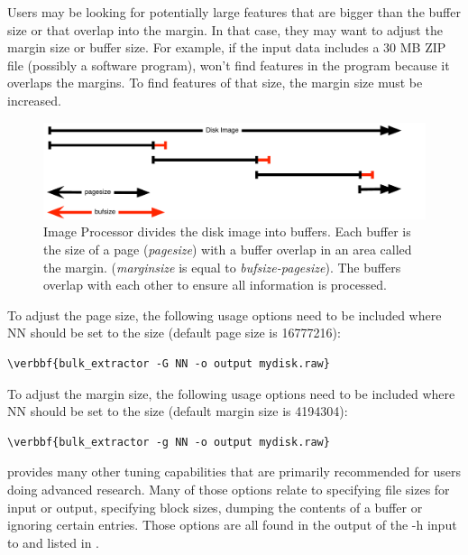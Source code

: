 \documentclass[11pt]{article} %
\begin{document}
Users may be looking for potentially large features that are bigger than the buffer size or that overlap into the margin. In that case, they may want to adjust the margin size or buffer size.  For example, if the input data includes a 30 MB ZIP file (possibly a software program), \bulk won't find features in the program because it overlaps the margins. To find features of that size, the margin size must be increased. \\

\begin{figure}
	\includegraphics[scale=0.60]{archPics/margindepiction.pdf}
	\caption{Image Processor divides the disk image into buffers. Each buffer is the size of a page (\textit{pagesize}) with a buffer overlap in an area called the margin. (\textit{marginsize} is equal to \textit{bufsize-pagesize}). The buffers overlap with each other to ensure all information is processed.}
	\label{fig:margindepiction}
\end{figure}

To adjust the page size, the following usage options need to be included where NN should be set to the size (default page size is 16777216):
\begin{Verbatim}[commandchars=\\\{\}]
\verbbf{bulk_extractor -G NN -o output mydisk.raw}
\end{Verbatim}

To adjust the margin size, the following usage options need to be included where NN should be set to the size (default margin size is 4194304):
\begin{Verbatim}[commandchars=\\\{\}]
\verbbf{bulk_extractor -g NN -o output mydisk.raw}
\end{Verbatim}

\bulk provides many other tuning capabilities that are primarily recommended for users doing advanced research. Many of those options relate to specifying file sizes for input or output, specifying block sizes, dumping the contents of a buffer or ignoring certain entries. Those options are all found in the output of the -h input to \bulk and listed in \textbf{}.
\end{document}
